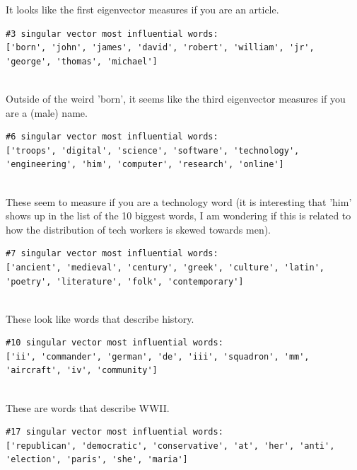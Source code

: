 \documentclass[12pt]{article}
\theoremstyle{definitionstyle}
\begin{document}
\begin{enumerate}[leftmargin=\labelsep]
\begin{enumerate}[label=\textbf{(\alph*)}]
                It looks like the first eigenvector measures if you are an article.
                
                \begin{lstlisting}
#3 singular vector most influential words:  
['born', 'john', 'james', 'david', 'robert', 'william', 'jr', 'george', 'thomas', 'michael']
                
                \end{lstlisting}

                Outside of the weird 'born', it seems like the third eigenvector measures if you are a (male) name.
                
                \begin{lstlisting}
#6 singular vector most influential words:  
['troops', 'digital', 'science', 'software', 'technology', 'engineering', 'him', 'computer', 'research', 'online']
                
                \end{lstlisting}

                These seem to measure if you are a technology word (it is interesting that 'him' shows up in the list of the 10 biggest words, I am wondering if this is related to how the distribution of tech workers is skewed towards men).
                
                \begin{lstlisting}
#7 singular vector most influential words:  
['ancient', 'medieval', 'century', 'greek', 'culture', 'latin', 'poetry', 'literature', 'folk', 'contemporary']
                
                \end{lstlisting}

                These look like words that describe history.
                
                \begin{lstlisting}
#10 singular vector most influential words: 
['ii', 'commander', 'german', 'de', 'iii', 'squadron', 'mm', 'aircraft', 'iv', 'community']
                
                \end{lstlisting}

                These are words that describe WWII.
                
                \begin{lstlisting}
#17 singular vector most influential words:  
['republican', 'democratic', 'conservative', 'at', 'her', 'anti', 'election', 'paris', 'she', 'maria']
                

\end{lstlisting}
\end{enumerate}
\end{enumerate}
\end{document}
